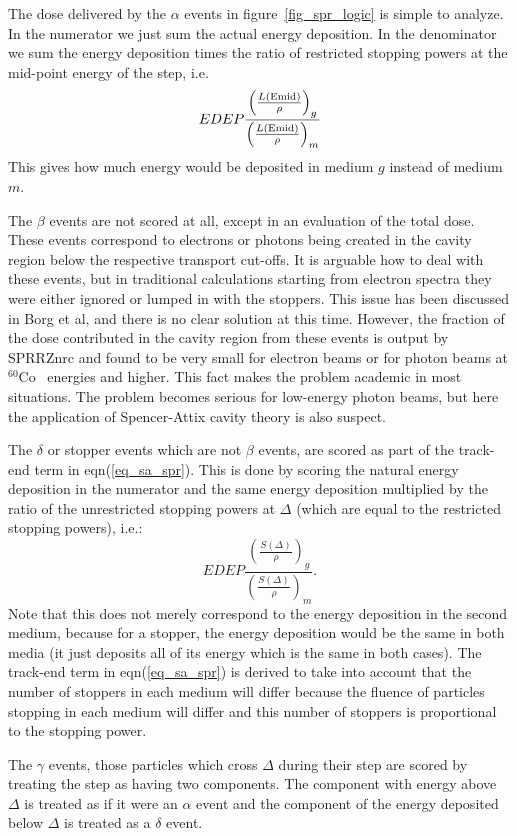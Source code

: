 \documentclass[12pt,twoside]{article}  %
\newcommand{\Co}{$^{60}$Co}
\newcommand{\eqn}[1]{\begin{equation} #1 \end{equation} }
\newcommand{\rspt}[1]{\left( \frac{S(\Delta)}{\rho} \right)_{#1}}
\newcommand{\rspE}[2]{\left( \frac{L({\rm #1})}{\rho} \right)_{#2}}
\begin{document}
The dose delivered by the $\alpha$ events in figure~\ref{fig_spr_logic}
is simple to analyze. In the numerator we just sum the actual energy
deposition. In the denominator we sum the energy deposition times 
the ratio of restricted stopping powers at the mid-point energy of the
step, i.e.
\eqn{EDEP \frac{\rspE{Emid}{g}}{\rspE{Emid}{m}}}
This gives how much energy would be deposited in medium $g$ instead of
medium $m$.

The $\beta$ events are not scored at all, except in an evaluation of the
total dose. These events correspond to electrons or photons being created
in the cavity region below the respective transport cut-offs. It is
arguable how to deal with these events, but in traditional calculations
starting from electron spectra they were either ignored or lumped in with
the stoppers.  This issue has been discussed in Borg et al, and there is no
clear solution at this time\cite{Bo99a}.  However, the fraction of the dose contributed
in the cavity region from these events is output by SPRRZnrc and found to
be very small for electron beams or for photon beams at \Co~ energies and
higher. This fact makes the problem academic in most situations.  The
problem becomes serious for low-energy photon beams, but here the
application of Spencer-Attix cavity theory is also suspect\cite{Bo99a}.

The $\delta$ or stopper events which are not $\beta$ events,
are scored as part of the track-end term in
eqn(\ref{eq_sa_spr}).  This is done by scoring the natural energy deposition
in the numerator and the same energy deposition multiplied by the ratio of
the unrestricted stopping powers at $\Delta$ (which are equal to the
restricted stopping powers), i.e.:
\eqn{EDEP \frac{\rspt{g}}{\rspt{m}}.}
Note that this does not merely correspond to the energy deposition in the
second medium, because for a stopper, the energy deposition would be the
same in both media (it just deposits all of its energy which is the same in
both cases). The track-end term in eqn(\ref{eq_sa_spr}) is derived to take
into account that the number of stoppers in each medium will differ because
the fluence of particles stopping in each medium will differ and this
number of stoppers is proportional to the stopping power.

The $\gamma$ events, those particles which cross $\Delta$ during their step
are scored by treating the step as having two components.  The component
with energy above $\Delta$ is treated as if it were an $\alpha$ event and
the component of the energy deposited below $\Delta$ is treated as a
$\delta$ event.
\end{document}

